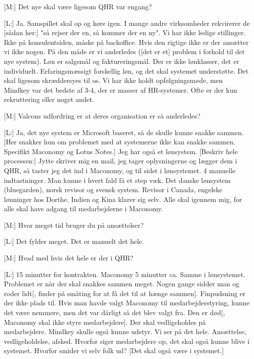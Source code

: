[M:] Det nye skal være ligesom QHR var engang?

[L:] Ja. Samspillet skal op og køre igen. I mange andre virksomheder rekvirerer de [sådan her:] "så rejser der en, så kommer der en ny". Vi har ikke ledige stillinger. Ikke på konsulentsiden, måske på backoffice. Hvis den rigtige ikke er der ansætter vi ikke nogen. På den måde er vi anderledes ([det er et] problem i forhold til det nye system). Løn er salgsmål og faktureringsmål. Der er ikke lønklasser, det er individuelt. Erfaringsmæssigt forskellig løn, og det skal systemet understøtte. Det skal ligesom skræddersyes til os. Vi har ikke holdt opfølgningsmøde, men Mindkey var det bedste af 3-4, der er masser af HR-systemer. Ofte er der kun rekruttering eller noget andet.

[M:] Valcons udfordring er at deres organisation er så anderledes?

[L:] Ja, det nye system er Microsoft baseret, så de skulle kunne snakke sammen. [Her snakker hun om problemet med at systemerne ikke kan snakke sammen. Specifikt Maconomy og Lotus Notes.]
Jeg har også et lønsystem.
[Beskriv hele processen:] Jytte skriver mig en mail, jeg tager oplysningerne og lægger dem i QHR, så taster jeg det ind i Maconomy, og til sidst i lønsystemet. 4 manuelle indtastninger. Man kunne i hvert fald få et step væk. Det danske lønsystem (bluegarden), norsk revisor og svensk system. Revisor i Canada, engelske lønninger hos Dorthe. Indien og Kina klarer sig selv. Alle skal igennem mig, for alle skal have adgang til medarbejderne i Maconomy.

[M:] Hvor meget tid bruger du på ansættelser?

[L:] Det fylder meget. Det er manuelt det hele.

[M:] Hvad med hvis det hele er der i QHR? 

[L:] 15 minutter for kontrakten. Maconomy 5 minutter ca. Samme i lønsystemet. Problemet er når der skal snakkes sammen meget. Nogen gange sidder man og roder lidt[, finder på småting for at få det til at hænge sammen]. Finpudsning er der ikke plads til. Hvis man havde valgt Maconomy til medarbejderstyring, kunne det være nemmere, men det var dårligt så det blev valgt fra. Den er død[, Maconomy skal ikke styre medarbejdere]. Der skal vedligeholdes på medarbejdere. Mindkey skulle også kunne udstyr. Vi ser på det hele. Ansættelse, vedligeholdelse, afsked. Hvorfor siger medarbejdere op, det skal også kunne blive i systemet. Hvorfor smider vi selv folk ud? [Det skal også være i systemet.]

